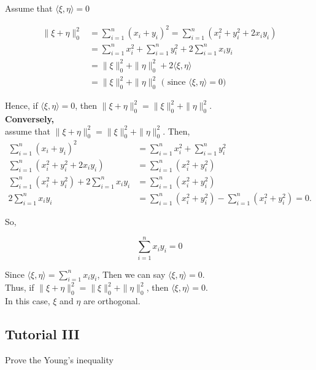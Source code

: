 \documentclass{article}
\begin{document}
Assume that $\langle\xi, \eta\rangle=0$

$$\begin{align}
\|\xi+\eta\|_{0}^{2}&=\sum_{i=1}^{n}\left(x_{i}+y_{i}\right)^{2}=\sum_{i=1}^{n}\left(x_{i}^{2}+y_{i}^{2}+2 x_{i} y_{i}\right)\\
&=\sum_{i=1}^{n} x_{i}^{2}+\sum_{i=1}^{n} y_{i}^{2}+2\sum_{i=1}^{n} x_iy_{i}\\
&=\|\xi\|_{0}^{2}+\|\eta\|_{0}^{2}
+2\langle \xi,\eta \rangle\\
&=\|\xi\|_{0}^{2}+\|\eta\|_{0}^{2} \text{ ( since }\langle \xi,\eta \rangle=0)
\end{align}$$


Hence, if $\langle\xi, \eta\rangle=0$, then $\|\xi+\eta\|_{0}^{2}=\|\xi\|_{0}^{2}+\|\eta\|_{0}^{2}$.\\

\textbf{Conversely, }\\

assume that $\|\xi+\eta\|_{0}^{2}=\|\xi\|_{0}^{2}+\|\eta\|_{0}^{2}$. Then,
$$
\begin{aligned}
\sum_{i=1}^{n}\left(x_{i}+y_{i}\right)^{2} & =\sum_{i=1}^{n} x_{i}^{2}+\sum_{i=1}^{n} y_{i}^{2} \\
\sum_{i=1}^{n}\left(x_{i}^{2}+y_{i}^{2}+2 x_{i} y_{i}\right) & =\sum_{i=1}^{n}\left(x_{i}^{2}+y_{i}^{2}\right) \\
\sum_{i=1}^{n}\left(x_{i}^{2}+y_{i}^{2}\right)+2 \sum_{i=1}^{n} x_{i} y_{i} & =\sum_{i=1}^{n}\left(x_{i}^{2}+y_{i}^{2}\right) \\
2 \sum_{i=1}^{n} x_{i} y_{i} & =\sum_{i=1}^{n}\left(x_{i}^{2}+y_{i}^{2}\right)-\sum_{i=1}^{n}\left(x_{i}^{2}+y_{i}^{2}\right)=0 .
\end{aligned}
$$

So,

$$
\sum_{i=1}^{n} x_{i} y_{i}=0
$$

Since $\langle\xi, \eta\rangle=\sum_{i=1}^{n} x_{i} y_{i}$, Then we can say $\langle\xi, \eta\rangle=0$.\\

Thus, if $\|\xi+\eta\|_{0}^{2}=\|\xi\|_{0}^{2}+\|\eta\|_{0}^{2}$, then $\langle\xi, \eta\rangle=0$.\\

In this case, $\xi$ and $\eta$ are orthogonal.



\newpage
\subsection{Tutorial III}
Prove the Young's inequality
\end{document}
